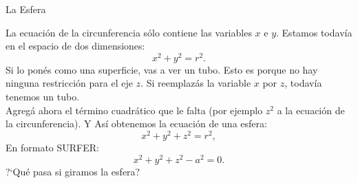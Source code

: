 \documentclass[es]{SurferDesc}%
\begin{document}
\footnotesize
%
\begin{surferPage}
  \begin{surferTitle}La Esfera\end{surferTitle}
   \begin{surferText}
   
La ecuaci{\'o}n de la circunferencia s{\'o}lo contiene las variables $x$ e $y$. Estamos todav{\'i}a en el espacio de dos dimensiones:
\[x^2+y^2=r^2.\]
Si lo pon{\'e}s como una superficie, vas a ver un tubo. Esto es porque no hay ninguna restricci{\'o}n para el eje $z$. Si reemplaz{\'a}s la variable $x$ por $z$, todav{\'i}a tenemos un tubo.\\
Agreg{\'a} ahora el t{\'e}rmino cuadr{\'a}tico que le falta (por ejemplo $z^2$ a la ecuaci{\'o}n de la circunferencia). 
Y As{\'i} obtenemos la ecuaci{\'o}n de una esfera:
\[x^2+y^2+z^2=r^2,\]
En formato SURFER:
\[x^2+y^2+z^2-a^2=0.\]
?`Qu{\'e} pasa si giramos la esfera?

     \end{surferText}
\end{surferPage}
\end{document}
